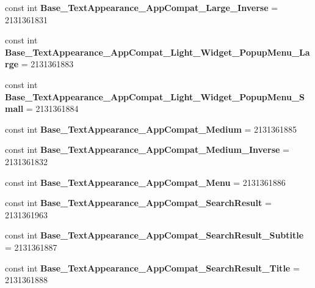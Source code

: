 \begin{DoxyCompactItemize}
const int {\bfseries Base\+\_\+\+Text\+Appearance\+\_\+\+App\+Compat\+\_\+\+Large\+\_\+\+Inverse} = 2131361831
\item 
\mbox{\label{classXaria_1_1Resource_1_1Style_a7fc728f78d77147a1182d7a629c23282}} 
const int {\bfseries Base\+\_\+\+Text\+Appearance\+\_\+\+App\+Compat\+\_\+\+Light\+\_\+\+Widget\+\_\+\+Popup\+Menu\+\_\+\+Large} = 2131361883
\item 
\mbox{\label{classXaria_1_1Resource_1_1Style_aac3fd06e5e55782682436f0ba8c00a70}} 
const int {\bfseries Base\+\_\+\+Text\+Appearance\+\_\+\+App\+Compat\+\_\+\+Light\+\_\+\+Widget\+\_\+\+Popup\+Menu\+\_\+\+Small} = 2131361884
\item 
\mbox{\label{classXaria_1_1Resource_1_1Style_ad607b394af1ade92b186ab78d8a3c292}} 
const int {\bfseries Base\+\_\+\+Text\+Appearance\+\_\+\+App\+Compat\+\_\+\+Medium} = 2131361885
\item 
\mbox{\label{classXaria_1_1Resource_1_1Style_a7c00d080f89f738ea88bd681d6748f9b}} 
const int {\bfseries Base\+\_\+\+Text\+Appearance\+\_\+\+App\+Compat\+\_\+\+Medium\+\_\+\+Inverse} = 2131361832
\item 
\mbox{\label{classXaria_1_1Resource_1_1Style_a077a078406b50ca453e69b0f4412866b}} 
const int {\bfseries Base\+\_\+\+Text\+Appearance\+\_\+\+App\+Compat\+\_\+\+Menu} = 2131361886
\item 
\mbox{\label{classXaria_1_1Resource_1_1Style_ae4c28cd2f4c02e9140b9643cbe43499c}} 
const int {\bfseries Base\+\_\+\+Text\+Appearance\+\_\+\+App\+Compat\+\_\+\+Search\+Result} = 2131361963
\item 
\mbox{\label{classXaria_1_1Resource_1_1Style_a7c54b4734ad801bd8dcd75d131f1f600}} 
const int {\bfseries Base\+\_\+\+Text\+Appearance\+\_\+\+App\+Compat\+\_\+\+Search\+Result\+\_\+\+Subtitle} = 2131361887
\item 
\mbox{\label{classXaria_1_1Resource_1_1Style_a62813f0d993c43f0b248b055e5a02ad3}} 
const int {\bfseries Base\+\_\+\+Text\+Appearance\+\_\+\+App\+Compat\+\_\+\+Search\+Result\+\_\+\+Title} = 2131361888

\end{DoxyCompactItemize}
